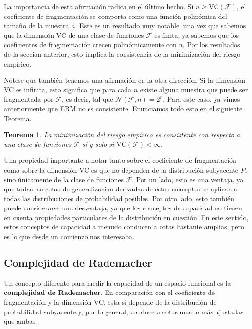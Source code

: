 \documentclass{report}
\newtheorem{thm}{Teorema}[section]
\begin{document}
La importancia de esta afirmación radica en el último hecho. Si \( n \geq \text{VC}(\mathcal{F}) \), 
el coeficiente de fragmentación se comporta como una función polinómica del tamaño de la muestra \( n \). 
Este es un resultado muy notable: una vez que sabemos que la dimensión VC de una clase de funciones 
\(\mathcal{F}\) es finita, ya sabemos que los coeficientes de fragmentación crecen polinómicamente con \( n \). 
Por los resultados de la sección anterior, esto implica la consistencia de la minimización del riesgo empírico.\newline

Nótese que también tenemos una afirmación en la otra dirección. Si la dimensión VC es infinita, esto significa 
que para cada \( n \) existe alguna muestra que puede ser fragmentada por \(\mathcal{F}\), es decir, tal que
\(\mathcal{N}(\mathcal{F}, n) = 2^n. \) Para este caso, ya vimos anteriormente que ERM no es consistente.
Enunciamos todo esto en el siguiente Teorema.\newline

\begin{thm}
    La minimización del riesgo empírico es consistente con respecto a una clase de funciones \(\mathcal{F}\) si y solo si
    \(\text{VC}(\mathcal{F}) < \infty\).\newline 
\end{thm}

Una propiedad importante a notar tanto sobre el coeficiente de fragmentación como sobre la 
dimensión VC es que no dependen de la distribución subyacente \( P \), sino únicamente de la 
clase de funciones \(\mathcal{F}\). Por un lado, esto es una ventaja, ya que todas las cotas de 
generalización derivadas de estos conceptos se aplican a todas las distribuciones de probabilidad 
posibles. Por otro lado, esto también puede considerarse una desventaja, ya que los conceptos de 
capacidad no tienen en cuenta propiedades particulares de la distribución en cuestión. En este 
sentido, estos conceptos de capacidad a menudo conducen a cotas bastante amplias, pero es lo que desde
un comienzo nos interesaba.\newline

\subsection{Complejidad de Rademacher}
Un concepto diferente para medir la capacidad de un espacio funcional es la \textbf{complejidad de Rademacher}. 
En comparación con el coeficiente de fragmentación y la dimensión VC, esta sí depende de la distribución de 
probabilidad subyacente y, por lo general, conduce a cotas mucho más ajustadas que ambas.\newline
\end{document}
